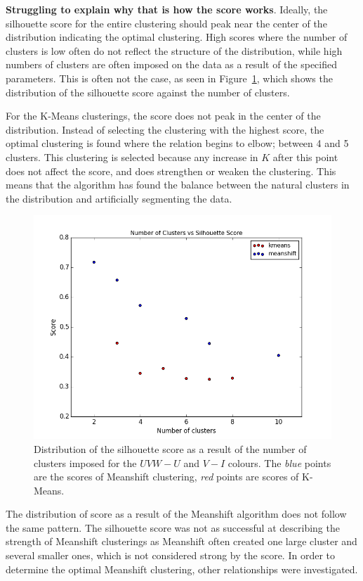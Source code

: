 \textbf{Struggling to explain why that is how the score works}. 
Ideally, the silhouette score for the entire clustering should peak near the center of the distribution indicating the optimal clustering. 
High scores where the number of clusters is low often do not reflect the structure of the distribution, while high numbers of clusters are often imposed on the data as a result of the specified parameters.
This is often not the case, as seen in Figure~\ref{fig:sscore}, which shows the distribution of the silhouette score against the number of clusters.

For the K-Means clusterings, the score does not peak in the center of the distribution.
Instead of selecting the clustering with the highest score, the optimal clustering is found where the relation begins to elbow; between 4 and 5 clusters.
This clustering is selected because any increase in $K$ after this point does not affect the score, and does strengthen or weaken the clustering.
This means that the algorithm has found the balance between the natural clusters in the distribution and artificially segmenting the data.

\begin{figure}[H]
\centering
\includegraphics[width=\linewidth]{figs/methods/UVW_U_score_vs_nclust}
\caption{Distribution of the silhouette score as a result of the number of clusters imposed for the $UVW - U$ and $V - I$ colours. The \textit{blue} points are the scores of Meanshift clustering, \textit{red} points are scores of K-Means.}
\label{fig:sscore}
\end{figure}

The distribution of score as a result of the Meanshift algorithm does not follow the same pattern.
The silhouette score was not as successful at describing the strength of Meanshift clusterings as Meanshift often created one large cluster and several smaller ones, which is not considered strong by the score.
In order to determine the optimal Meanshift clustering, other relationships were investigated.

